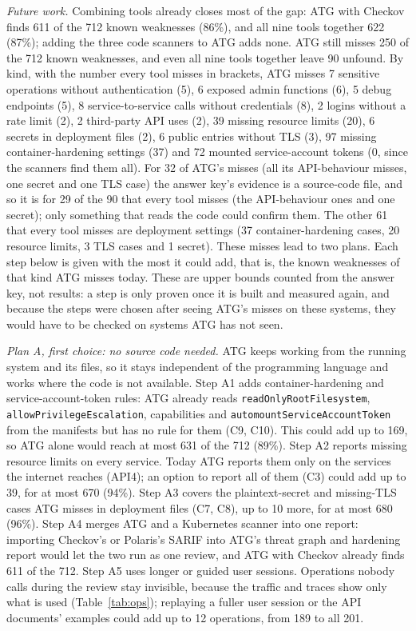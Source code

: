 \documentclass[conference]{IEEEtran}
\begin{document}
\textit{Future work.} Combining tools already closes most of the gap: ATG with Checkov finds 611 of the 712 known weaknesses (86\%), and all nine tools together 622 (87\%); adding the three code scanners to ATG adds none. ATG still misses 250 of the 712 known weaknesses, and even all nine tools together leave 90 unfound. By kind, with the number every tool misses in brackets, ATG misses 7 sensitive operations without authentication (5), 6 exposed admin functions (6), 5 debug endpoints (5), 8 service-to-service calls without credentials (8), 2 logins without a rate limit (2), 2 third-party API uses (2), 39 missing resource limits (20), 6 secrets in deployment files (2), 6 public entries without TLS (3), 97 missing container-hardening settings (37) and 72 mounted service-account tokens (0, since the scanners find them all). For 32 of ATG's misses (all its API-behaviour misses, one secret and one TLS case) the answer key's evidence is a source-code file, and so it is for 29 of the 90 that every tool misses (the API-behaviour ones and one secret); only something that reads the code could confirm them. The other 61 that every tool misses are deployment settings (37 container-hardening cases, 20 resource limits, 3 TLS cases and 1 secret). These misses lead to two plans. Each step below is given with the most it could add, that is, the known weaknesses of that kind ATG misses today. These are upper bounds counted from the answer key, not results: a step is only proven once it is built and measured again, and because the steps were chosen after seeing ATG's misses on these systems, they would have to be checked on systems ATG has not seen.

\textit{Plan A, first choice: no source code needed.} ATG keeps working from the running system and its files, so it stays independent of the programming language and works where the code is not available. Step A1 adds container-hardening and service-account-token rules: ATG already reads \texttt{readOnlyRootFilesystem}, \texttt{allowPrivilegeEscalation}, capabilities and \texttt{automountServiceAccountToken} from the manifests but has no rule for them (C9, C10). This could add up to 169, so ATG alone would reach at most 631 of the 712 (89\%). Step A2 reports missing resource limits on every service. Today ATG reports them only on the services the internet reaches (API4); an option to report all of them (C3) could add up to 39, for at most 670 (94\%). Step A3 covers the plaintext-secret and missing-TLS cases ATG misses in deployment files (C7, C8), up to 10 more, for at most 680 (96\%). Step A4 merges ATG and a Kubernetes scanner into one report: importing Checkov's or Polaris's SARIF into ATG's threat graph and hardening report would let the two run as one review, and ATG with Checkov already finds 611 of the 712. Step A5 uses longer or guided user sessions. Operations nobody calls during the review stay invisible, because the traffic and traces show only what is used (Table~\ref{tab:ops}); replaying a fuller user session or the API documents' examples could add up to 12 operations, from 189 to all 201.
\end{document}
